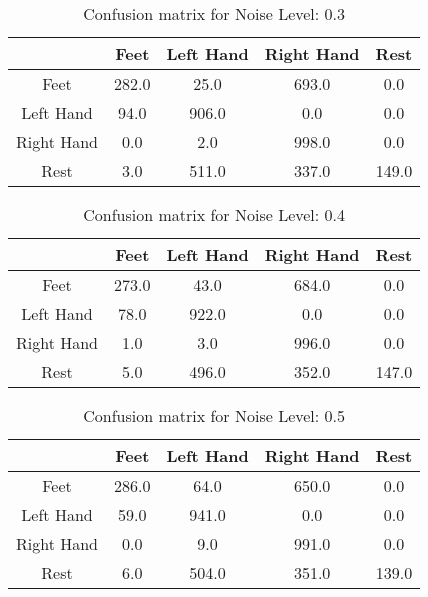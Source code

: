 \begin{table}[!htbp]
    \centering
    \begin{tabular}{|c||c|c|c|c|}
        \hline
		 & Feet & Left Hand & Right Hand & Rest \\
        \hline
        \hline
        Feet & 282.0 & 25.0 & 693.0 & 0.0 \\
        \hline
        Left Hand & 94.0 & 906.0 & 0.0 & 0.0 \\
        \hline
        Right Hand & 0.0 & 2.0 & 998.0 & 0.0 \\
        \hline
        Rest & 3.0 & 511.0 & 337.0 & 149.0 \\
        \hline
    \end{tabular}
    \caption{Confusion matrix for Noise Level: 0.3}
\end{table}

\begin{table}[!htbp]
    \centering
    \begin{tabular}{|c||c|c|c|c|}
        \hline
		 & Feet & Left Hand & Right Hand & Rest \\
        \hline
        \hline
        Feet & 273.0 & 43.0 & 684.0 & 0.0 \\
        \hline
        Left Hand & 78.0 & 922.0 & 0.0 & 0.0 \\
        \hline
        Right Hand & 1.0 & 3.0 & 996.0 & 0.0 \\
        \hline
        Rest & 5.0 & 496.0 & 352.0 & 147.0 \\
        \hline
    \end{tabular}
    \caption{Confusion matrix for Noise Level: 0.4}
\end{table}

\begin{table}[!htbp]
    \centering
    \begin{tabular}{|c||c|c|c|c|}
        \hline
		 & Feet & Left Hand & Right Hand & Rest \\
        \hline
        \hline
        Feet & 286.0 & 64.0 & 650.0 & 0.0 \\
        \hline
        Left Hand & 59.0 & 941.0 & 0.0 & 0.0 \\
        \hline
        Right Hand & 0.0 & 9.0 & 991.0 & 0.0 \\
        \hline
        Rest & 6.0 & 504.0 & 351.0 & 139.0 \\
        \hline
    \end{tabular}
    \caption{Confusion matrix for Noise Level: 0.5}
\end{table}

